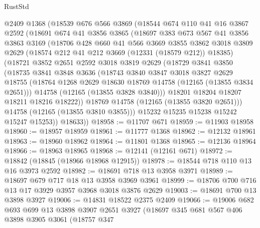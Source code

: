 \begin{lexlean}{RustStd}
\begin{coremodule}
    @2409
    @1368
    (@18539
      @676
      @566
      @3869
      (@18544
        @674
        @110
        @41
        @16
        @3867
        @2592
        (@18691
          @674
          @41
          @3856
          @3865
          (@18697
            @383
            @673
            @567
            @41
            @3856
            @3863
            @3169
            (@18706
              @428
              @660
              @41
              @566
              @3669
              @3855
              @3862
              @3018
              @3809
              @2629
              (@18574 @212 @41 @212 @3669 (@12331 (@18579 @212)) @18385)
              (@18721
                @3852
                @2651
                @2592
                @3018
                @3819
                @2629
                (@18729
                  @3841
                  @3850
                  (@18735
                    @3841
                    @3848
                    @3636
                    (@18743
                      @3840
                      @3847
                      @3018
                      @3827
                      @2629
                      @18755
                      (@18764 @1268 @2629 @18630 @18769 @14758 (@12165 (@13855 @3834 @2651)))
                      @14758
                      (@12165 (@13855 @3828 @3840)))
                    @18201
                    @18204
                    @18207
                    @18211
                    @18216
                    @18222))
                @18769
                @14758
                (@12165 (@13855 @3820 @2651)))
              @14758
              (@12165 (@13855 @3810 @3855)))
            @15232
            @15235
            @15238
            @15242
            @15247
            @15253))
        @18633))
@18958 := @11707 @671
@18959 := @11903 @18958
@18960 := @18957 @18959
@18961 := @11777 @1368
@18962 := @12132 @18961
@18963 := @18960 @18962
@18964 := @11801 @1368
@18965 := @12136 @18964
@18966 := @18963 @18965
@18968 := @12141 (@12161 @671)
@18972 := @18842 (@18845 (@18966 @18968 @12915))
@18978 := @18544 @718 @110 @13 @16 @3973 @2592
@18982 := @18691 @718 @13 @3958 @3971
@18989 := @18697 @679 @717 @18 @13 @3958 @3969 @3961
@18999 := @18706 @700 @716 @13 @17 @3929 @3957 @3968 @3018 @3876 @2629
@19003 := @18691 @700 @13 @3898 @3927
@19006 := @14831 @18522 @2375 @2409
@19066 := @19006
    @682
    @693
    @699
    @13
    @3898
    @3907
    @2651
    @3927
    (@18697
      @345
      @681
      @567
      @406
      @3898
      @3905
      @3061
      (@18757
        @347

\end{coremodule}
\end{lexlean}
